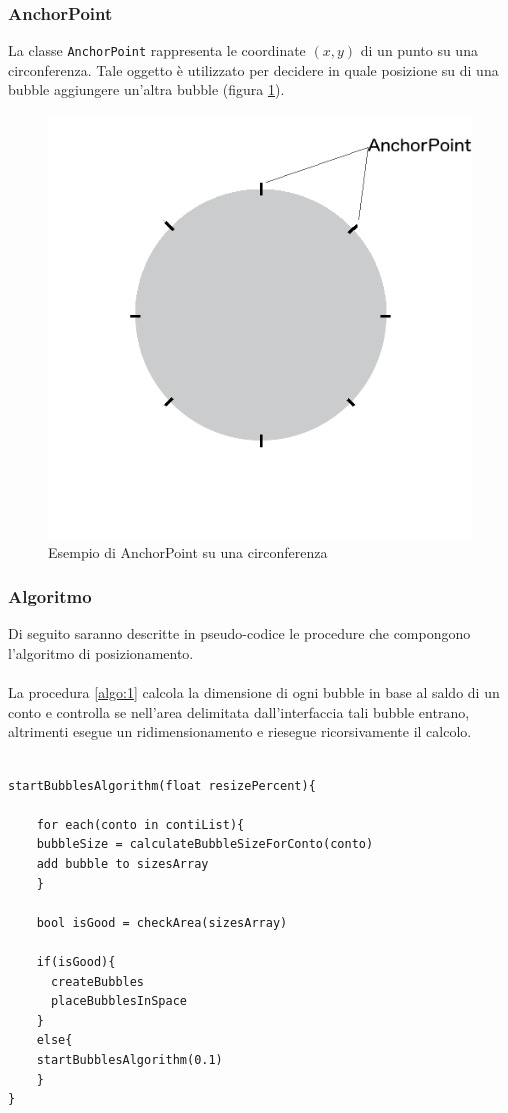 \subsubsection{AnchorPoint}

La classe \texttt{AnchorPoint} rappresenta le coordinate $(x,y)$ di un punto su una circonferenza. Tale oggetto è utilizzato per decidere in quale posizione su di una bubble aggiungere un'altra bubble (figura \ref{fig:anchor}). 

\begin{figure}[!htbp]
\centering
\includegraphics[scale=0.4]{dettagli/anchor.png}
\caption{Esempio di AnchorPoint su una circonferenza}
\label{fig:anchor}
\end{figure}

\subsubsection{Algoritmo}
Di seguito saranno descritte in pseudo-codice le procedure che compongono l'algoritmo di posizionamento.
\\\\
La procedura \ref{algo:1} calcola la dimensione di ogni bubble in base al saldo di un conto e controlla se nell'area delimitata dall'interfaccia tali bubble entrano, altrimenti esegue un ridimensionamento e riesegue ricorsivamente il calcolo.
\begin{lstlisting}[label=algo:1,caption=startBubblesAlgorithm]

startBubblesAlgorithm(float resizePercent){
    
    for each(conto in contiList){
	bubbleSize = calculateBubbleSizeForConto(conto)
	add bubble to sizesArray
    }
  
    bool isGood = checkArea(sizesArray)
    
    if(isGood){
      createBubbles
      placeBubblesInSpace
    }
    else{
	startBubblesAlgorithm(0.1)
    }
}


\end{lstlisting}

